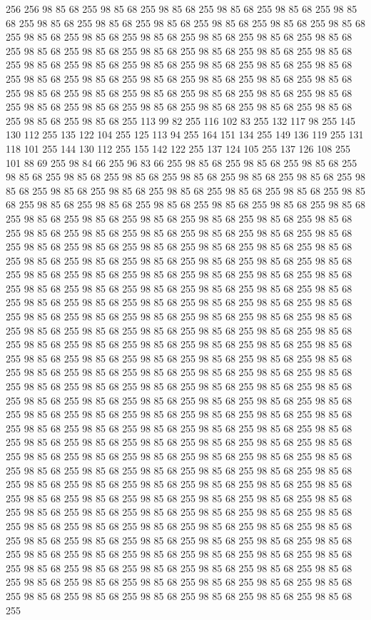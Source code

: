 256 256 98 85 68 255 98 85 68 255 98 85 68 255 98 85 68 255 98 85 68 255 98 85 68 255 98 85 68 255 98 85 68 255 98 85 68 255 98 85 68 255 98 85 68 255 98 85 68 255 98 85 68 255 98 85 68 255 98 85 68 255 98 85 68 255 98 85 68 255 98 85 68 255 98 85 68 255 98 85 68 255 98 85 68 255 98 85 68 255 98 85 68 255 98 85 68 255 98 85 68 255 98 85 68 255 98 85 68 255 98 85 68 255 98 85 68 255 98 85 68 255 98 85 68 255 98 85 68 255 98 85 68 255 98 85 68 255 98 85 68 255 98 85 68 255 98 85 68 255 98 85 68 255 98 85 68 255 98 85 68 255 98 85 68 255 98 85 68 255 98 85 68 255 98 85 68 255 98 85 68 255 98 85 68 255 98 85 68 255 98 85 68 255 98 85 68 255 98 85 68 255 113 99 82 255 116 102 83 255 132 117 98 255 145 130 112 255 135 122 104 255 125 113 94 255 164 151 134 255 149 136 119 255 131 118 101 255 144 130 112 255 155 142 122 255 137 124 105 255 137 126 108 255 101 88 69 255
98 84 66 255 96 83 66 255 98 85 68 255 98 85 68 255 98 85 68 255 98 85 68 255 98 85 68 255 98 85 68 255 98 85 68 255 98 85 68 255 98 85 68 255 98 85 68 255 98 85 68 255 98 85 68 255 98 85 68 255 98 85 68 255 98 85 68 255 98 85 68 255 98 85 68 255 98 85 68 255 98 85 68 255 98 85 68 255 98 85 68 255 98 85 68 255 98 85 68 255 98 85 68 255 98 85 68 255 98 85 68 255 98 85 68 255 98 85 68 255 98 85 68 255 98 85 68 255 98 85 68 255 98 85 68 255 98 85 68 255 98 85 68 255 98 85 68 255 98 85 68 255 98 85 68 255 98 85 68 255 98 85 68 255 98 85 68 255 98 85 68 255 98 85 68 255 98 85 68 255 98 85 68 255 98 85 68 255 98 85 68 255 98 85 68 255 98 85 68 255 98 85 68 255 98 85 68 255 98 85 68 255 98 85 68 255 98 85 68 255 98 85 68 255 98 85 68 255 98 85 68 255 98 85 68 255 98 85 68 255 98 85 68 255 98 85 68 255 98 85 68 255 98 85 68 255
98 85 68 255 98 85 68 255 98 85 68 255 98 85 68 255 98 85 68 255 98 85 68 255 98 85 68 255 98 85 68 255 98 85 68 255 98 85 68 255 98 85 68 255 98 85 68 255 98 85 68 255 98 85 68 255 98 85 68 255 98 85 68 255 98 85 68 255 98 85 68 255 98 85 68 255 98 85 68 255 98 85 68 255 98 85 68 255 98 85 68 255 98 85 68 255 98 85 68 255 98 85 68 255 98 85 68 255 98 85 68 255 98 85 68 255 98 85 68 255 98 85 68 255 98 85 68 255 98 85 68 255 98 85 68 255 98 85 68 255 98 85 68 255 98 85 68 255 98 85 68 255 98 85 68 255 98 85 68 255 98 85 68 255 98 85 68 255 98 85 68 255 98 85 68 255 98 85 68 255 98 85 68 255 98 85 68 255 98 85 68 255 98 85 68 255 98 85 68 255 98 85 68 255 98 85 68 255 98 85 68 255 98 85 68 255 98 85 68 255 98 85 68 255 98 85 68 255 98 85 68 255 98 85 68 255 98 85 68 255 98 85 68 255 98 85 68 255 98 85 68 255 98 85 68 255
98 85 68 255 98 85 68 255 98 85 68 255 98 85 68 255 98 85 68 255 98 85 68 255 98 85 68 255 98 85 68 255 98 85 68 255 98 85 68 255 98 85 68 255 98 85 68 255 98 85 68 255 98 85 68 255 98 85 68 255 98 85 68 255 98 85 68 255 98 85 68 255 98 85 68 255 98 85 68 255 98 85 68 255 98 85 68 255 98 85 68 255 98 85 68 255 98 85 68 255 98 85 68 255 98 85 68 255 98 85 68 255 98 85 68 255 98 85 68 255 98 85 68 255 98 85 68 255 98 85 68 255 98 85 68 255 98 85 68 255 98 85 68 255 98 85 68 255 98 85 68 255 98 85 68 255 98 85 68 255 98 85 68 255 98 85 68 255 98 85 68 255 98 85 68 255 98 85 68 255 98 85 68 255 98 85 68 255 98 85 68 255 98 85 68 255 98 85 68 255 98 85 68 255 98 85 68 255 98 85 68 255 98 85 68 255 98 85 68 255 98 85 68 255 98 85 68 255 98 85 68 255 98 85 68 255 98 85 68 255 98 85 68 255 98 85 68 255 98 85 68 255 98 85 68 255
